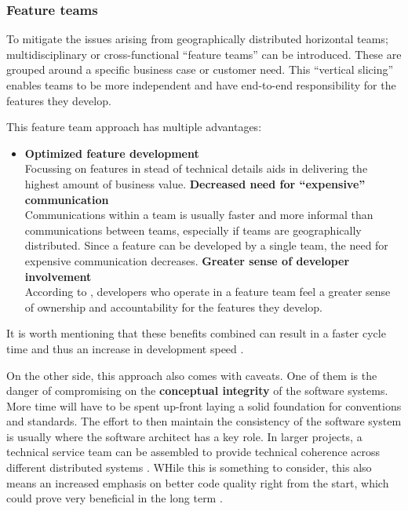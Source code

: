 \subsubsection{Feature teams}
\label{feature-teams}


To mitigate the issues arising from geographically distributed horizontal teams;
multidisciplinary or cross-functional ``feature teams'' can be introduced. These
are grouped around a specific business case or customer need. This ``vertical
slicing''  enables teams to be more independent and have end-to-end
responsibility for the features they develop.

This feature team approach has multiple advantages: \autocite{Smite_etal_2010}
\begin{itemize} 
  \item \textbf{Optimized feature development}\\
  Focussing on features in stead of technical details aids in delivering the
  highest amount of business value.
  \spacedItem \textbf{Decreased need for ``expensive'' communication}\\
  Communications within a team is usually faster and more informal than
  communications between teams, especially if teams are geographically
  distributed. Since a feature can be developed by a single team, the need for
  expensive communication decreases.
  \spacedItem \textbf{Greater sense of developer involvement}\\
  According to \autocite{LarmanVodde_2008}, developers who operate in a feature
  team feel a greater sense of ownership and accountability for the features
  they develop. 
\end{itemize}

It is worth mentioning that these benefits combined can result in a faster cycle
time and thus an increase in development speed \autocite{Geers_2020}.

On the other side, this approach also comes with caveats. One of them is the
danger of compromising on the \textbf{conceptual integrity} of the software
systems. More time will have to be spent up-front laying a solid foundation for
conventions and standards. The effort to then maintain the consistency of the
software system is usually where the software architect has a key role. In
larger projects, a technical service team can be assembled to provide technical
coherence across different distributed systems \autocite{Smite_etal_2010}. WHile
this is something to consider, this also means an increased emphasis on better
code quality right from the start, which could prove very beneficial in the long
term \autocite{LarmanVodde_2008}.

